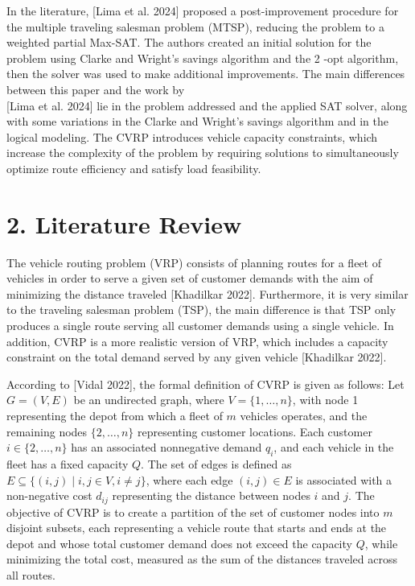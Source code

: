 \documentclass[10pt]{article}
\begin{document}
In the literature, [Lima et al. 2024] proposed a post-improvement procedure for the multiple traveling salesman problem (MTSP), reducing the problem to a weighted partial Max-SAT. The authors created an initial solution for the problem using Clarke and Wright's savings algorithm and the 2 -opt algorithm, then the solver was used to make additional improvements. The main differences between this paper and the work by\\[0pt]
[Lima et al. 2024] lie in the problem addressed and the applied SAT solver, along with some variations in the Clarke and Wright's savings algorithm and in the logical modeling. The CVRP introduces vehicle capacity constraints, which increase the complexity of the problem by requiring solutions to simultaneously optimize route efficiency and satisfy load feasibility.

\section*{2. Literature Review}
The vehicle routing problem (VRP) consists of planning routes for a fleet of vehicles in order to serve a given set of customer demands with the aim of minimizing the distance traveled [Khadilkar 2022]. Furthermore, it is very similar to the traveling salesman problem (TSP), the main difference is that TSP only produces a single route serving all customer demands using a single vehicle. In addition, CVRP is a more realistic version of VRP, which includes a capacity constraint on the total demand served by any given vehicle [Khadilkar 2022].

According to [Vidal 2022], the formal definition of CVRP is given as follows: Let $G=(V, E)$ be an undirected graph, where $V=\{1, \ldots, n\}$, with node 1 representing the depot from which a fleet of $m$ vehicles operates, and the remaining nodes $\{2, \ldots, n\}$ representing customer locations. Each customer $i \in\{2, \ldots, n\}$ has an associated nonnegative demand $q_{i}$, and each vehicle in the fleet has a fixed capacity $Q$. The set of edges is defined as $E \subseteq\{(i, j) \mid i, j \in V, i \neq j\}$, where each edge $(i, j) \in E$ is associated with a non-negative cost $d_{i j}$ representing the distance between nodes $i$ and $j$. The objective of CVRP is to create a partition of the set of customer nodes into $m$ disjoint subsets, each representing a vehicle route that starts and ends at the depot and whose total customer demand does not exceed the capacity $Q$, while minimizing the total cost, measured as the sum of the distances traveled across all routes.
\end{document}
